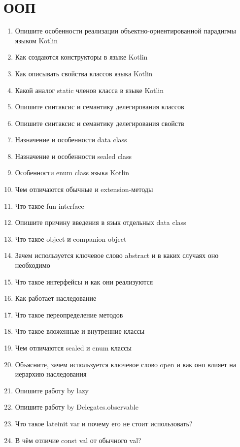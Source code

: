 \documentclass[12pt]{article}
\begin{document}
\section*{ООП}
\begin{enumerate}
  \item Опишите особенности реализации объектно-ориентированной парадигмы языком Kotlin
  \item Как создаются конструкторы в языке Kotlin
  \item Как описывать свойства классов языка Kotlin
  \item Какой аналог static членов класса в языке Kotlin
  \item Опишите синтаксис и семантику делегирования классов
  \item Опишите синтаксис и семантику делегирования свойств
  \item Назначение и особенности data class
  \item Назначение и особенности sealed class
  \item Особенности enum class языка Kotlin
  \item Чем отличаются обычные и extension-методы
  \item Что такое fun interface
  \item Опишите причину введения в язык отдельных data class
  \item Что такое object и companion object
  \item Зачем используется ключевое слово abstract и в каких случаях оно необходимо
  \item Что такое интерфейсы и как они реализуются
  \item Как работает наследование
  \item Что такое переопределение методов
  \item Что такое вложенные и внутренние классы
  \item Чем отличаются sealed и enum классы
  \item Объясните, зачем используется ключевое слово open и как оно влияет на иерархию наследования
  \item Опишите работу by lazy
  \item Опишите работу by Delegates.observable
  \item Что такое lateinit var и почему его не стоит использовать?
  \item В чём отличие const val от обычного val?
\end{enumerate}
\end{document}
